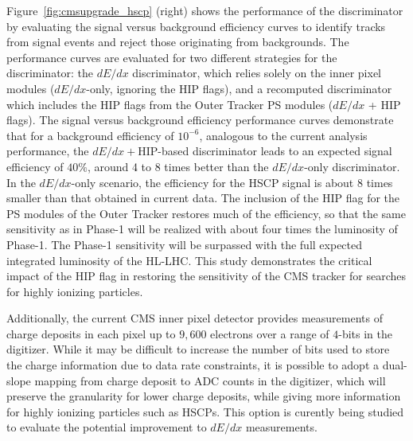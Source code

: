 Figure~\ref{fig:cmsupgrade_hscp} (right) shows the performance of the discriminator by evaluating the signal versus background
efficiency curves to identify tracks from signal events and reject those originating from backgrounds. 
The performance curves are evaluated for two different strategies for
the discriminator: the $dE/dx$ discriminator, which relies solely on the inner pixel modules
($dE/dx$-only, ignoring the HIP flags), and a recomputed discriminator which includes the
HIP flags from the Outer Tracker PS modules ($dE/dx$ + HIP flags).
The signal versus background
efficiency performance curves demonstrate that for a background efficiency
of $10^{-6}$, analogous to the current analysis performance, the $dE/dx+$HIP-based discriminator
leads to an expected signal efficiency of $40\%$, around 4 to 8 times better than the $dE/dx$-only
discriminator. In the $dE/dx$-only scenario, the efficiency for the HSCP signal is about 8 times
smaller than that obtained in current data. The inclusion of the HIP flag for the PS modules of the Outer Tracker restores much of the efficiency, so that the
same sensitivity as in Phase-1 will be realized with about four times the luminosity of Phase-1.
The Phase-1 sensitivity will be surpassed with the full expected integrated luminosity of the
HL-LHC. This study demonstrates the critical impact of the HIP flag in restoring the sensitivity
of the CMS tracker for searches for highly ionizing particles.

Additionally, the current CMS inner pixel detector provides measurements of charge deposits in each pixel up to $9,600$ electrons over a range of $4$-bits in the digitizer. 
While it may be difficult to increase the number of bits used to store the charge information due to data rate constraints, it is possible to adopt a dual-slope mapping from charge deposit to ADC counts in the digitizer, which will preserve the granularity for lower charge deposits, while giving more information for highly ionizing particles such as HSCPs. This option is curently being studied to evaluate the potential improvement to $dE/dx$ measurements. 

